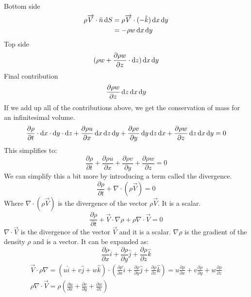 \documentclass[class=report, crop=false, 12pt,a4paper]{standalone}
\begin{document}
Bottom side
\begin{align}
  \rho \overrightarrow{V} \cdot \hat{n} \dif S &= \rho \overrightarrow{V} \cdot (- \hat{k}) \dif x \dif y\\
  &= -\rho w \dif x \dif y
\end{align}
Top side
\begin{equation}
  (\rho w + \frac{\partial \rho w}{\partial z} \cdot \dif z) \dif x \dif y
\end{equation}
Final contribution
\begin{equation}
  \frac{\partial \rho w}{\partial z} \dif z \dif x \dif y 
\end{equation}
If we add up all of the contributions above, we get the conservation of mass for an infinitesimal volume.
\begin{equation}
  \frac{\partial \rho}{\partial t} \cdot\dif x \cdot \dif y \cdot \dif z + \frac{\partial \rho u}{\partial x} \dif x \dif z \dif y + \frac{\partial \rho v}{\partial y} \dif y \dif z \dif x + \frac{\partial \rho w}{\partial z} \dif z \dif x \dif y = 0
\end{equation}
This simplifies to:
\begin{equation}
  \frac{\partial \rho}{\partial t} + \frac{\partial \rho u}{\partial x} + \frac{\partial \rho v}{\partial y} + \frac{\partial \rho w}{\partial z} = 0
\end{equation}
We can simplify this a bit more by introducing a term called the divergence.
\begin{equation}
  \frac{\partial \rho}{\partial t} + \nabla \cdot (\rho \overrightarrow{V}) = 0
\end{equation}
Where $\nabla \cdot (\rho \overrightarrow{V})$ is the divergence of the vector $\rho \overrightarrow{V}$. It is a scalar.
\begin{equation}
  \frac{\partial \rho}{\partial t} + \overrightarrow{V}\cdot \nabla \rho + \rho \nabla \cdot \overrightarrow{V} = 0
\end{equation}
$\nabla \cdot \overrightarrow{V}$ is the divergence of the vector $\overrightarrow{V}$ and it is a scalar. $\nabla \rho$ is the gradient of the density $\rho$ and is a vector. It can be expanded as:
\begin{equation}
  \frac{\partial \rho}{\partial x} \hat{i} + \frac{\partial \rho}{\partial y} \hat{j} + \frac{\partial \rho}{\partial z} \hat{k}
\end{equation}
\begin{gather}
  \overrightarrow{V} \cdot \rho \nabla = (u \hat{i} + v \hat{j} + w \hat{k}) \cdot \left( \frac{\partial \rho}{\partial x} \hat{i} + \frac{\partial \rho}{\partial y} \hat{j} + \frac{\partial \rho}{\partial z} \hat{k} \right) = u \frac{\partial \rho}{\partial x} + v \frac{\partial \rho}{\partial y} + w \frac{\partial \rho}{\partial z}\\
  \rho \nabla \cdot \overrightarrow{V} = \rho \left( \frac{\partial u}{\partial x} + \frac{\partial v}{\partial y} + \frac{\partial w}{\partial z} \right)
\end{gather}
\end{document}
